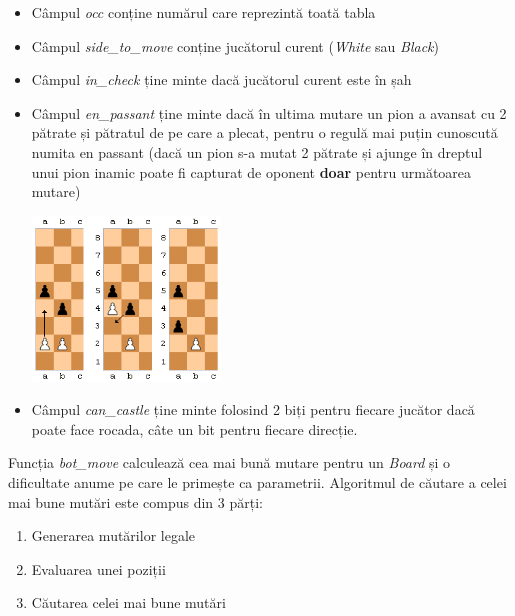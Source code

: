 \begin{itemize}
	\item Câmpul \textit{occ} conține numărul care reprezintă toată tabla
	\item Câmpul \textit{side\_to\_move} conține jucătorul curent (\textit{White} sau \textit{Black})
	\item Câmpul \textit{in\_check} ține minte dacă jucătorul curent este în șah
	\item Câmpul \textit{en\_passant} ține minte dacă în ultima mutare un pion a avansat cu 2
	      pătrate și pătratul de pe care a plecat, pentru o regulă mai puțin cunoscută numita
	      en passant (dacă un pion s-a mutat 2 pătrate și ajunge în dreptul unui pion inamic
	      poate fi capturat de oponent \textbf{doar} pentru următoarea mutare)

	      \begin{center}
		      \includegraphics[width=5cm]{3/alg/en_passant.png}
	      \end{center}
	      \vspace{1cm}

	\item Câmpul \textit{can\_castle} ține minte folosind 2 biți pentru fiecare jucător dacă
	      poate face rocada, câte un bit pentru fiecare direcție.
\end{itemize}
\vspace{1cm}


Funcția \textit{bot\_move} calculează cea mai bună mutare pentru un \textit{Board} și o
dificultate anume pe care le primește ca parametrii.
Algoritmul de căutare a celei mai bune mutări este compus din 3 părți:
\begin{enumerate}
	\item Generarea mutărilor legale
	\item Evaluarea unei poziții
	\item Căutarea celei mai bune mutări
\end{enumerate}
